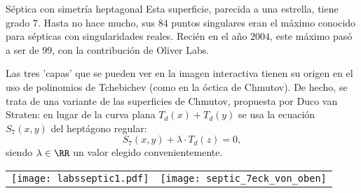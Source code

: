 \begin{surferPage}{Séptica con simetría heptagonal}
    Esta superficie, parecida a una estrella, tiene grado $7$.
    Hasta no hace mucho, sus $84$ puntos singulares eran el máximo conocido para sépticas
    con singularidades reales. Recién en el año $2004$, este máximo pasó a ser de $99$,
    con la contribución de Oliver Labs.

    Las tres 'capas' que se pueden ver en la imagen interactiva tienen su origen
    en el uso de polinomios de Tchebichev (como en la óctica de Chmutov).
    De hecho, se trata de una variante de las superficies de Chmutov, propuesta por Duco van Straten:
    en lugar de la curva plana $T_d(x)+T_d(y)$ se usa la ecuación
    $S_7(x,y)$ del heptágono regular:
    \[S_7(x,y) + \lambda \cdot T_d(z) = 0,\]
    siendo $\lambda\in\RR$ un valor elegido convenientemente.


    \vspace*{-0.3em}
    \begin{center}
      \begin{tabular}{c@{\qquad}c}
        \texttt{[image: labsseptic1.pdf]}
        &
        \texttt{[image: septic\_7eck\_von\_oben]}
      \end{tabular}
    \end{center}
    \vspace*{-0.3em}
\end{surferPage}
